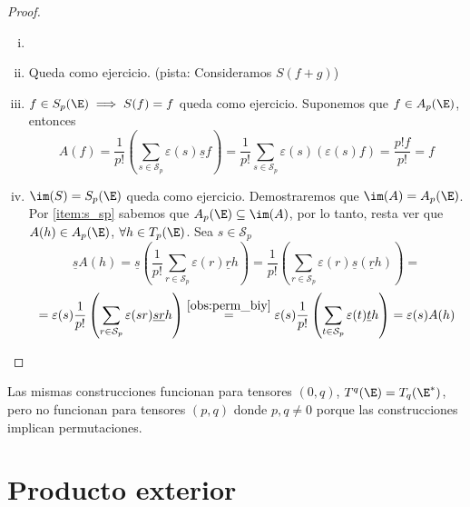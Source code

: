 \begin{proof}
    \begin{enumerate}[i)]
    \item[]
    \item
        Queda como ejercicio.  (pista:  Consideramos $ S(f+g) $)
    \item
        $ f \in S_p(\E) \implies S(f) = f $ queda como ejercicio.
        Suponemos que $ f \in A_p(\E) $, entonces
        \[
            A(f) = \frac{1}{p!} \left(\sum_{s \in \mathcal{S}_p}
            \varepsilon(s)\underline{s}f \right) = \frac{1}{p!}\sum_{s
            \in \mathcal{S}_p} \varepsilon(s) \left( \varepsilon(s)f
            \right) = \frac{p!f}{p!} = f
        \]
    \item
        $ \im(S)=S_p(\E) $ queda como ejercicio.  Demostraremos que $
        \im(A)=A_p(\E) $. Por%
        \ref{item:s_sp} sabemos que $ A_p(\E) \subseteq \im(A) $, por lo
        tanto, resta ver que $ A(h)\in A_p(\E) $, $ \forall h \in T_p(\E)
        $.  Sea $ s \in \mathcal{S}_p $
        \[
            \underline{s}A(h) = \underline{s}\left( \frac{1}{p!}\sum_{r
            \in \mathcal{S}_p} \varepsilon(r)\underline{r}h \right) =
            \frac{1}{p!}\left(\sum_{r \in \mathcal{S}_p} \varepsilon(r)\underline
            {s}(\underline{r}h)\right) =
        \]
        \[
            = \varepsilon(s)\frac{1}{p!} \left( \sum_{r \in \mathcal{S}_p}
            \varepsilon(sr) \underline{sr}h \right) \stackrel{%
            \ref{obs:perm_biy}}{=} \varepsilon(s)\frac{1}{p!} \left(
            \sum_{t \in \mathcal{S}_p} \varepsilon(t) \underline{t}h
            \right) = \varepsilon(s)A(h)
        \]
\end{enumerate}
\end{proof}
\begin{obs}
    Las mismas construcciones funcionan para tensores $ (0,q) $, $ T^q(\E)
    = T_q(\E^*) $, pero no funcionan para tensores $ (p,q) $ donde $ p,q
    \neq 0 $ porque las construcciones implican permutaciones.
\end{obs}


\section{Producto exterior}

